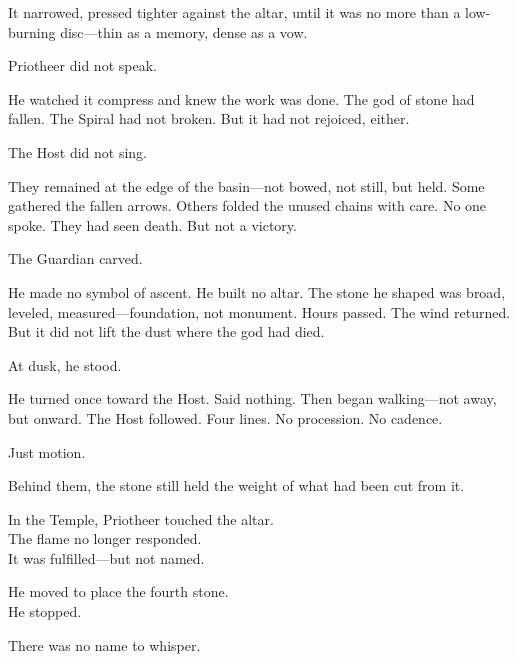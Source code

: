 \documentclass[12pt]{article}
\begin{document}
\vspace{0.5em}
It narrowed, pressed tighter against the altar, until it was no more than a low-burning disc---thin as a memory, dense as a vow.

\vspace{0.5em}
Priotheer did not speak.

\vspace{0.5em}
He watched it compress and knew the work was done. The god of stone had fallen. The Spiral had not broken. But it had not rejoiced, either.

\vspace{0.5em}
The Host did not sing.

\vspace{0.5em}
They remained at the edge of the basin---not bowed, not still, but held. Some gathered the fallen arrows. Others folded the unused chains with care. No one spoke. They had seen death. But not a victory.

\vspace{0.5em}
The Guardian carved.

\vspace{0.5em}
He made no symbol of ascent. He built no altar. The stone he shaped was broad, leveled, measured---foundation, not monument. Hours passed. The wind returned. But it did not lift the dust where the god had died.

\vspace{0.5em}
At dusk, he stood.

\vspace{0.5em}
He turned once toward the Host. Said nothing. Then began walking---not away, but onward. The Host followed. Four lines. No procession. No cadence.

\vspace{0.5em}
Just motion.

\vspace{0.5em}
Behind them, the stone still held the weight of what had been cut from it.

\vspace{0.5em}
In the Temple, Priotheer touched the altar.\\
The flame no longer responded.\\
It was fulfilled---but not named.

\vspace{0.5em}
He moved to place the fourth stone.\\
He stopped.

\vspace{0.5em}
There was no name to whisper.
\end{document}
